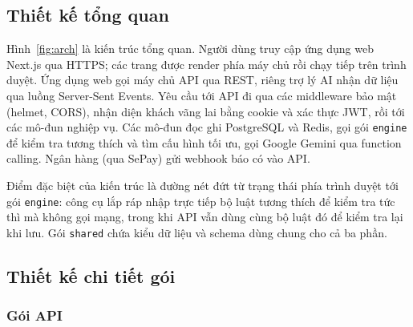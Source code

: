\subsection{Thiết kế tổng quan}


Hình~\ref{fig:arch} là kiến trúc tổng quan. Người dùng truy cập ứng dụng web Next.js qua HTTPS; các trang được render phía máy chủ rồi chạy tiếp trên trình duyệt. Ứng dụng web gọi máy chủ API qua REST, riêng trợ lý AI nhận dữ liệu qua luồng Server-Sent Events. Yêu cầu tới API đi qua các middleware bảo mật (helmet, CORS), nhận diện khách vãng lai bằng cookie và xác thực JWT, rồi tới các mô-đun nghiệp vụ. Các mô-đun đọc ghi PostgreSQL và Redis, gọi gói \texttt{engine} để kiểm tra tương thích và tìm cấu hình tối ưu, gọi Google Gemini qua function calling. Ngân hàng (qua SePay) gửi webhook báo có vào API.

Điểm đặc biệt của kiến trúc là đường nét đứt từ trạng thái phía trình duyệt tới gói \texttt{engine}: công cụ lắp ráp nhập trực tiếp bộ luật tương thích để kiểm tra tức thì mà không gọi mạng, trong khi API vẫn dùng cùng bộ luật đó để kiểm tra lại khi lưu. Gói \texttt{shared} chứa kiểu dữ liệu và schema dùng chung cho cả ba phần.

\subsection{Thiết kế chi tiết gói}

\subsubsection{Gói API}


